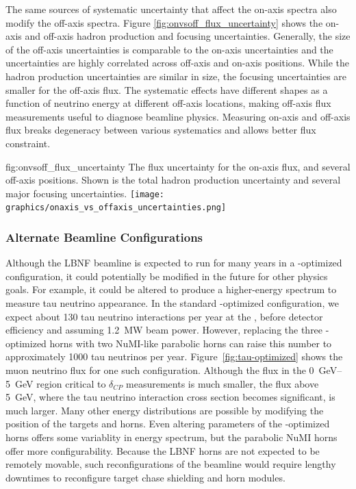 The same sources of systematic uncertainty that affect the on-axis spectra also modify the off-axis spectra. 
Figure \ref{fig:onvsoff_flux_uncertainty} shows the on-axis and off-axis hadron production and focusing uncertainties. 
Generally, the size of the off-axis uncertainties is comparable to the on-axis uncertainties and the uncertainties are highly correlated across off-axis and on-axis positions. While the hadron production uncertainties are similar in size, the focusing uncertainties are smaller for the off-axis flux. The systematic effects have different shapes as a function of neutrino energy at different off-axis locations, making off-axis flux measurements useful to diagnose beamline physics. Measuring on-axis and off-axis flux breaks degeneracy between various systematics and allows better flux constraint.



\begin{dunefigure}{fig:onvsoff_flux_uncertainty}
{The flux uncertainty for the on-axis flux, and several off-axis positions. Shown is the total hadron production uncertainty and several major focusing uncertainties.}
    \texttt{[image: graphics/onaxis\_vs\_offaxis\_uncertainties.png]}
\end{dunefigure}

\subsubsection{Alternate Beamline Configurations}

Although the LBNF beamline is expected to run for many years in a -optimized configuration, it could potentially be modified in the future for other physics goals.  For example, it could be altered to produce a higher-energy spectrum %
to measure tau neutrino appearance.  In the standard -optimized configuration, we expect about 130 tau neutrino  interactions per year %
at the , before detector efficiency and assuming \SI{1.2}{MW} beam power.  However, replacing the three -optimized horns with two NuMI-like parabolic horns can raise this number to approximately \num{1000} tau neutrinos per year.  Figure~\ref{fig:tau-optimized} shows the muon neutrino flux for one such configuration.  Although the flux in the \SIrange{0}{5}{\GeV} region critical to $\delta_{CP}$ measurements is much smaller, the flux above \SI{5}{\GeV}, where the tau neutrino interaction cross section becomes significant, is much larger.  Many other energy distributions are possible by modifying the position of the targets and horns.  Even altering parameters of the -optimized horns offers some variablity in energy spectrum, but the parabolic NuMI horns offer more configurability.  Because the LBNF horns are not expected to be remotely movable, such reconfigurations of the beamline would require lengthy downtimes to reconfigure target chase shielding and horn modules.   

